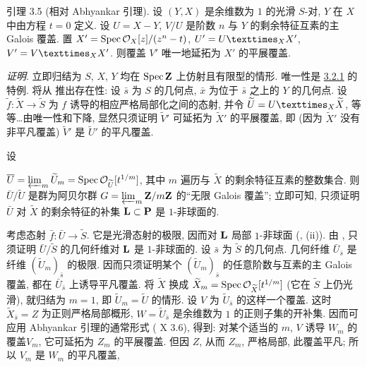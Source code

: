 \begin{enonce*}{引理 3.5}
(相对 Abhyankar 引理). 设 $(Y,X)$ 是余维数为 $1$ 的光滑 $S$-对, $Y$ 在 $X$ 中由方程 $t=0$ 定义. 设 $U=X-Y$, $V/U$ 是阶数 $n$ 与 $Y$ 的剩余特征互素的主 Galois 覆盖. 置 $X'=\operatorname{Spec} {\mathcal O}_X[z]/(z^n-t)$, $U'=\fprod{U}{X'}{X}$, $V'=\fprod{V}{X'}{X}$. 则覆盖 $V'$ 唯一地延拓为 $X'$ 的平展覆盖.
\end{enonce*}

\noindent
\emph{证明}. 立即归结为 $S$, $X$, $Y$ 均在 $\operatorname{Spec} \mathbf{Z}$ 上仿射且有限型的情形. 唯一性是 \hyperref[XVI.cor3.2.1]{3.2.1} 的特例. 将从  推出存在性: 设 $\bar{s}$ 为 $S$ 的几何点, $\bar{x}$ 为位于 $\bar{s}$ 之上的 $Y$ 的几何点. 设 $\widetilde{f}:\widetilde{X}\rightarrow \widetilde{S}$ 为 $f$ 诱导的相应严格局部化\pageoriginale 之间的态射, 并令 $\widetilde{U}=\fprod{U}{\widetilde{X}}{X}$, 等等\ldots 由唯一性和下降, 显然只须证明 $\widetilde{V}'$ 可延拓为 $\widetilde{X}'$ 的平展覆盖, 即 (因为 $\widetilde{X}'$ 没有非平凡覆盖) $\widetilde{V}'$ 是 $\widetilde{U}'$ 的平凡覆盖.

设

$\overline{U}=\varprojlim_m\widetilde{U}_{m}=\operatorname{Spec} {\mathcal O}_{\widetilde{U}}[t^{1/m}]$,
其中 $m$ 遍历与 $\widetilde{X}$ 的剩余特征互素的整数集合. 则 $\bar{U}/\widetilde{U}$ 是群为阿贝尔群 $G=\varprojlim_m \mathbf{Z}/m\mathbf{Z}$ 的“无限 Galois 覆盖”; 立即可知, 只须证明 $\bar{U}$ 对 $\widetilde{X}$ 的剩余特征的补集 $\mathbf{L}\subset \mathbf{P}$ 是 $1$-非球面的.

考虑态射 $\bar{f}:\bar{U}\rightarrow \widetilde{S}$. 它是光滑态射的极限, 因而对 $\mathbf{L}$ 局部 $1$-非球面 (,  (ii)). 由 , 只须证明 $\bar{U}/\widetilde{S}$ 的几何纤维对 $\mathbf{L}$ 是 $1$-非球面的. 设 $\bar{s}$ 为 $\widetilde{S}$ 的几何点. 几何纤维 $\bar{U}_{\bar{s}}$ 是纤维 $(\widetilde{U}_m)_{\bar{s}}$ 的极限. 因而只须证明某个 $(\widetilde{U}_m)_{\bar{s}}$ 的任意阶数与互素的主 Galois 覆盖, 都在 $\bar{U}_{\bar{s}}$ 上诱导平凡覆盖. 将 $\widetilde{X}$ 换成 $\widetilde{X}_m=\operatorname{Spec} {\mathcal O}_{\widetilde{X}}[t^{1/m}]$ (它在 $\widetilde{S}$ 上仍光滑), 就归结为 $m=1$, 即 $\widetilde{U}_m=\widetilde{U}$ 的情形. 设 $V$ 为 $\widetilde{U}_{\bar{s}}$ 的这样一个覆盖. 这时 $\widetilde{X}_{\bar{s}}=Z$ 为正则严格局部概形, $W=\widetilde{U}_{\bar{s}}$ 是余维数为 $1$ 的正则子集的开补集. 因而可应用 Abhyankar 引理的通常形式 ( X 3.6), 得到: 对某个适当的 $m$, $V$ 诱导 $W_m$ 的覆盖\pageoriginale $V_m$, 它可延拓为 $Z_m$ 的平展覆盖. 但因 $Z$, 从而 $Z_m$, 严格局部, 此覆盖平凡; 所以 $V_m$ 是 $W_m$ 的平凡覆盖, \cqfd


